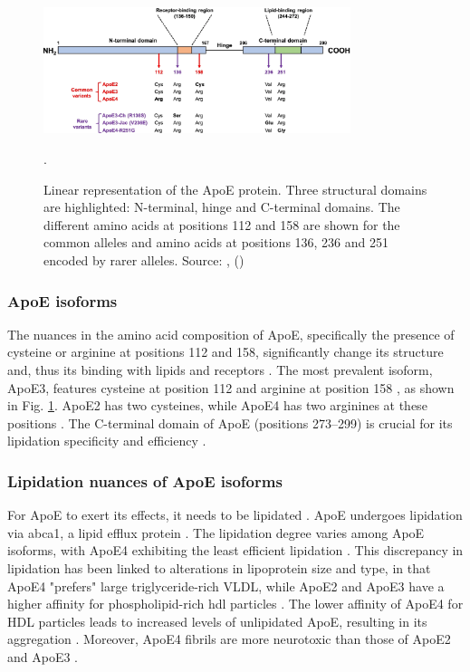\documentclass{amsart}
\begin{document}
\begin{figure}[htb]
  \includegraphics[width=0.8\textwidth]{figures/ApoEprot.png}
    \caption{Linear representation of the ApoE protein. Three structural domains are highlighted: N-terminal, hinge and C-terminal domains. The different amino acids at positions 112 and 158 are shown for the common alleles and amino acids at positions 136, 236 and 251 encoded by rarer alleles. Source: ,  (\citeyear{Bu2022APOEVariants}) \cite{Bu2022APOEVariants}}.
  \label{fig2}
\end{figure}

\subsubsection{ApoE isoforms}
The nuances in the amino acid composition of ApoE, specifically the presence of cysteine or arginine at positions 112 and 158, significantly change its structure and, thus its binding with lipids and receptors \cite{Yassine2020APOEDisease}. The most prevalent isoform, ApoE3, features cysteine at position 112 and arginine at position 158  \cite{Yassine2020APOEDisease}, as shown in Fig. \ref{fig2}. ApoE2 has two cysteines, while ApoE4 has two arginines at these positions \cite{Yassine2020APOEDisease}. The C-terminal domain of ApoE (positions 273–299) is crucial for its lipidation specificity and efficiency \cite{Hu2015OpposingMice}.

\subsubsection{Lipidation nuances of ApoE isoforms}
For ApoE to exert its effects, it needs to be lipidated \cite{Husain2021APOETherapeutics}. ApoE undergoes lipidation via \acrfull{abca1}, a lipid efflux protein \cite{Flowers2020APOEBrain, Courtney2016LXRDisease}. The lipidation degree varies among ApoE isoforms, with ApoE4 exhibiting the least efficient lipidation \cite{Hu2015OpposingMice, Heinsinger2016ApolipoproteinFluid}. This discrepancy in lipidation has been linked to alterations in lipoprotein size and type, in that ApoE4 "prefers" large triglyceride-rich VLDL, while ApoE2 and ApoE3 have a higher affinity for phospholipid-rich \acrshort{hdl} particles \cite{Nguyen2010MolecularE4}. The lower affinity of ApoE4 for HDL particles leads to increased levels of unlipidated ApoE, resulting in its aggregation \cite{Hatters2006ApolipoproteinFunction}. Moreover, ApoE4 fibrils are more neurotoxic than those of ApoE2 and ApoE3 \cite{Hatters2006Amino-terminalFibrils}.
\end{document}
